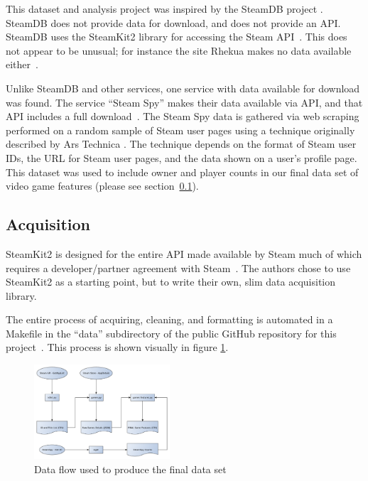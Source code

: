 \documentclass[letterpaper,10pt,twocolumn]{article}
\begin{document}
This dataset and analysis project was inspired by the SteamDB project
\cite{steamdb}. SteamDB does not provide data for download, and does not
provide an API\@. SteamDB uses the SteamKit2 library for accessing the Steam
API~\cite{steamkit,steamdb-faq}. This does not appear to be unusual;
for instance the site Rhekua makes no data available either~\cite{rhekua}.

Unlike SteamDB and other services, one service with data available for
download was found. The service ``Steam Spy'' makes their data available via
API, and that API includes a full download~\cite{steamspy}. The Steam Spy data
is gathered via web scraping performed on a random sample of Steam user pages
using a technique originally described by Ars Technica
\cite{steamspy-about,steamgauge}. The technique depends on the format of Steam
user IDs, the URL for Steam user pages, and the data shown on a user's
profile page. This dataset was used to include owner and player counts in our
final data set of video game features (please see section~\ref{data-grab}).

\subsection{Acquisition}

\label{data-grab}

SteamKit2 is designed for the entire API made available by Steam
much of which requires a developer/partner agreement with
Steam~\cite{steamkit,steam-dev}. The authors chose to use SteamKit2 as a
starting point, but to write their own, slim data acquisition library.

The entire process of acquiring, cleaning, and formatting is automated in a
Makefile in the ``data'' subdirectory of the public GitHub repository for this
project~\cite{our-github}. This process is shown visually in figure
\ref{fig:data-flow}.

\begin{figure}[H]
    \caption{Data flow used to produce the final data set\label{fig:data-flow}}
    \includegraphics[width=0.45\textwidth,keepaspectratio]{data-flow}
\end{figure}
\end{document}
